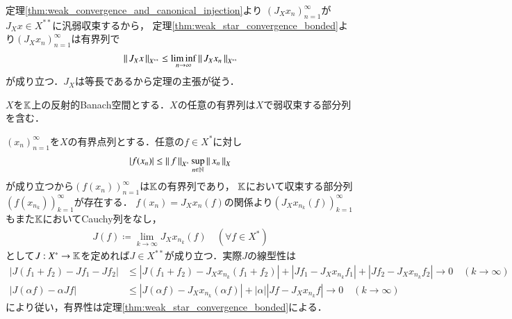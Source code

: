 	\begin{prf}
		定理\ref{thm:weak_convergence_and_canonical_injection}より
		$(J_X x_n)_{n=1}^{\infty}$が$J_X x \in X^{**}$に汎弱収束するから，
		定理\ref{thm:weak_star_convergence_bonded}より$(J_X x_n)_{n=1}^{\infty}$は有界列で
		\begin{align}
			\left\|\, J_X x\, \right\|_{X^{**}} \leq \liminf_{n \to \infty} \left\|\, J_X x_n\, \right\|_{X^{**}}
		\end{align}
		が成り立つ．$J_X$は等長であるから定理の主張が従う．
		\QED
	\end{prf}
	
	\begin{screen}
		\begin{thm}[反射的Banach空間の有界列は弱収束する部分列を含む]
			$X$を$\mathbb{K}$上の反射的Banach空間とする．$X$の任意の有界列は$X$で弱収束する部分列を含む．
		\end{thm}
	\end{screen}
	
	\begin{prf}
		$(x_n)_{n=1}^{\infty}$を$X$の有界点列とする．任意の$f \in X^*$に対し
		\begin{align}
			\left| f(x_n) \right| \leq \left\|\, f\, \right\|_{X^*} \operatorname*{sup}_{n \in \mathbb{N}} \left\|\, x_n\, \right\|_{X}
		\end{align}
		が成り立つから$\left( f(x_n) \right)_{n=1}^{\infty}$は$\mathbb{K}$の有界列であり，
		$\mathbb{K}$において収束する部分列$\left( f\left(x_{n_k}\right) \right)_{k=1}^{\infty}$が存在する．
		$f(x_n) = J_X x_n(f)$の関係より$\left( J_X x_{n_k}(f) \right)_{k=1}^{\infty}$もまた$\mathbb{K}$においてCauchy列をなし，
		\begin{align}
			J(f) \coloneqq \lim_{k \to \infty} J_X x_{n_k}(f) \quad (\forall f \in X^*)
		\end{align}
		として$J:X^* \rightarrow \mathbb{K}$を定めれば$J \in X^{**}$が成り立つ．実際$J$の線型性は
		\begin{align}
			\left| J(f_1 + f_2) - J f_1 - J f_2\right| &\leq \left| J(f_1 + f_2) - J_X x_{n_k}(f_1 + f_2)\right| + \left| J f_1 - J_X x_{n_k} f_1 \right| 
				+ \left| J f_2 - J_X x_{n_k} f_2 \right| \longrightarrow 0 \quad (k \longrightarrow \infty) \\
			\left| J(\alpha f) - \alpha J f \right| &\leq \left| J(\alpha f) - J_X x_{n_k}(\alpha f) \right| + |\alpha| \left| J f - J_X x_{n_k} f \right|
				\longrightarrow 0 \quad (k \longrightarrow \infty)
		\end{align}
		により従い，有界性は定理\ref{thm:weak_star_convergence_bonded}による．
	\end{prf}